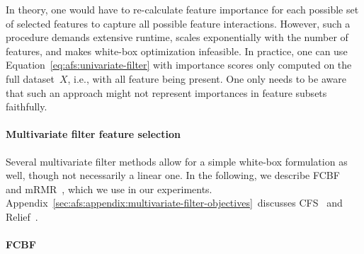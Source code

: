 \documentclass{article}
\theoremstyle{definition}
\begin{document}
In theory, one would have to re-calculate feature importance for each possible set of selected features to capture all possible feature interactions.
However, such a procedure demands extensive runtime, scales exponentially with the number of features, and makes white-box optimization infeasible.
In practice, one can use Equation~\ref{eq:afs:univariate-filter} with importance scores only computed on the full dataset~$X$, i.e., with all feature being present.
One only needs to be aware that such an approach might not represent importances in feature subsets faithfully.

\paragraph{Multivariate filter feature selection}

Several multivariate filter methods allow for a simple white-box formulation as well, though not necessarily a linear one.
In the following, we describe FCBF~\cite{yu2003feature} and mRMR~\cite{peng2005feature}, which we use in our experiments.
Appendix~\ref{sec:afs:appendix:multivariate-filter-objectives}~discusses CFS~\cite{hall1999correlation, hall2000correlation} and Relief~\cite{kira1992feature, robnik1997adaptation}.

\paragraph{FCBF}
\end{document}

